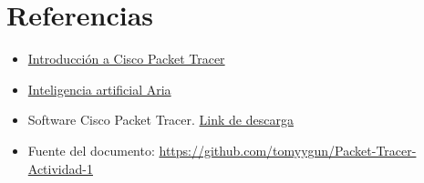 \documentclass{article}
\begin{document}
\section{Referencias}
\begin{itemize}
    \item \href{https://skillsforall.com/course/getting-started-cisco-packet-tracer?utm_source=netacad.com&utm_medium=referral&utm_campaign=packet-tracer&courseLang=es-XL&userlogin=0}{Introducción a Cisco Packet Tracer}

    \item \href{https://www.opera.com/es-419/features/aria} {Inteligencia artificial Aria}

    \item Software Cisco Packet Tracer. \href{https://www.netacad.com/es/courses/packet-tracer}{Link de descarga}
    
    \item Fuente del documento: \href{https://github.com/tomyygun/Packet-Tracer-Actividad-1}{https://github.com/tomyygun/Packet-Tracer-Actividad-1}
\end{itemize}
\end{document}
